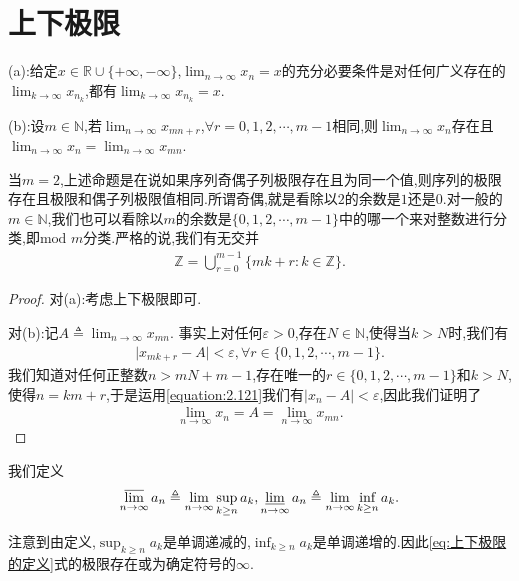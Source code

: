 \documentclass[../../main.tex]{subfiles}
\begin{document}
\section{上下极限}

\begin{proposition}[子列极限命题]\label{proposition:子列极限命题}
(a):给定\(x \in \mathbb{R} \cup \{+\infty, -\infty\}\),\(\lim_{n \to \infty} x_n = x\)的充分必要条件是对任何广义存在的\(\lim_{k \to \infty} x_{n_k}\),都有\(\lim_{k \to \infty} x_{n_k} = x\).

(b):设\(m \in \mathbb{N}\),若\(\lim_{n \to \infty} x_{mn + r}\),\(\forall r = 0,1,2,\cdots,m - 1\)相同,则\(\lim_{n \to \infty} x_n\)存在且
\(\lim_{n \to \infty} x_n = \lim_{n \to \infty} x_{mn}\).
\end{proposition}
\begin{note}
当\(m = 2\),上述命题是在说如果序列奇偶子列极限存在且为同一个值,则序列的极限存在且极限和偶子列极限值相同.所谓奇偶,就是看除以\(2\)的余数是\(1\)还是\(0\).对一般的\(m \in \mathbb{N}\),我们也可以看除以\(m\)的余数是\(\{0,1,2,\cdots,m - 1\}\)中的哪一个来对整数进行分类,即\(\text{mod } m\)分类.严格的说,我们有无交并
\begin{align*}
\mathbb{Z} = \bigcup_{r = 0}^{m - 1} \{mk + r : k \in \mathbb{Z}\}.
\end{align*}
\end{note}
\begin{proof}
对(a):考虑上下极限即可.

对(b):记\(A \triangleq \lim_{n \to \infty} x_{mn}\).
事实上对任何\(\varepsilon > 0\),存在\(N \in \mathbb{N}\),使得当\(k > N\)时,我们有
\begin{align}\label{equation:2.121}
\vert x_{mk + r} - A \vert < \varepsilon, \forall r \in \{0,1,2,\cdots,m - 1\}.
\end{align}
我们知道对任何正整数\(n > mN + m - 1\),存在唯一的\(r \in \{0,1,2,\cdots,m - 1\}\)和\(k > N\),使得\(n = km + r\),于是运用\eqref{equation:2.121}我们有\(\vert x_n - A \vert < \varepsilon\),因此我们证明了
\begin{align*}
\lim_{n \to \infty} x_n = A = \lim_{n \to \infty} x_{mn} .
\end{align*}
\end{proof}

\begin{definition}[上下极限的定义]\label{theorem:上下极限的定义}
我们定义
\begin{align}\label{eq:上下极限的定义}
\varlimsup_{n \to \infty} a_n \triangleq \lim_{n \to \infty} \sup_{k \geq n} a_k, \varliminf_{n \to \infty} a_n \triangleq \lim_{n \to \infty} \inf_{k \geq n} a_k. 
\end{align}
\end{definition}
\begin{note}
注意到由定义,\(\sup_{k \geq n} a_k\)是单调递减的,\(\inf_{k \geq n} a_k\)是单调递增的.因此\eqref{eq:上下极限的定义}式的极限存在或为确定符号的\(\infty\).
\end{note}
\end{document}
